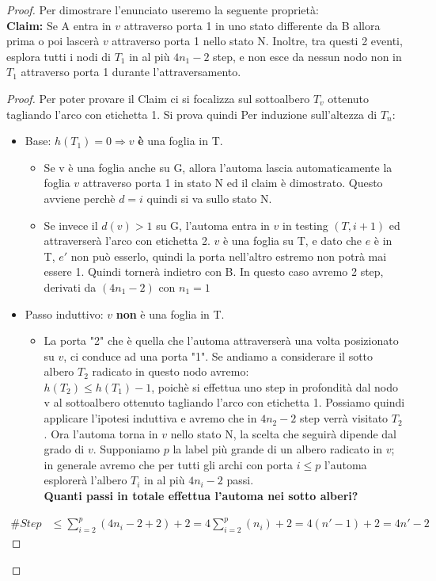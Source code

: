 \begin{proof}
Per dimostrare l'enunciato useremo la seguente proprietà:\\
\textbf{Claim: } Se A entra in $v$ attraverso porta 1 in uno stato differente da B allora prima o poi lascerà $v$ attraverso porta 1 nello stato N. Inoltre, tra questi 2 eventi, esplora tutti i nodi di $T_1$ in al più $4n_1 - 2$ step, e non esce da nessun nodo non in $T_1$ attraverso porta 1 durante l'attraversamento.
\begin{proof}
Per poter provare il Claim ci si focalizza sul sottoalbero $T_v$ ottenuto tagliando l'arco con etichetta 1. Si prova quindi Per induzione sull'altezza di $T_n$:
\begin{itemize}
    \item Base: $h(T_1) = 0 \Rightarrow v$ \textbf{è} una foglia in T.
        \begin{itemize}
            \item Se v è una foglia anche su G, allora l'automa lascia automaticamente la foglia $v$ attraverso porta 1 in stato N ed il claim è dimostrato. Questo avviene perchè $d=i$ quindi si va sullo stato N.
            \item Se invece il $d(v)>1$ su G, l'automa entra in $v$ in testing $(T, i+1)$ ed attraverserà l'arco con etichetta 2. $v$ è una foglia su T, e dato che $e$ è in T, $e'$ non può esserlo, quindi la porta nell'altro estremo non potrà mai essere 1. Quindi tornerà indietro con B. In questo caso avremo 2 step, derivati da $(4n_1 -2)$ con $n_1=1$ 
        \end{itemize}
    \item Passo induttivo: $v$ \textbf{non} è una foglia in T.
    \begin{itemize}
        \item La porta "2" che è quella che l'automa attraverserà una volta posizionato su $v$, ci conduce ad una porta "1". Se andiamo a considerare il sotto albero $T_2$ radicato in questo nodo avremo:\\
        $h(T_2) \leq h(T_1) -1$, poichè si effettua uno step in profondità dal nodo v al sottoalbero ottenuto tagliando l'arco con etichetta 1.
        Possiamo quindi applicare l'ipotesi induttiva e avremo che in $4n_2-2$ step verrà visitato $T_2$.
        Ora l'automa torna in $v$ nello stato N, la scelta che seguirà dipende dal grado di $v$. Supponiamo $p$ la label più grande di un albero radicato in $v$; in generale avremo che per tutti gli archi con porta $i \leq p$ l'automa esplorerà l'albero $T_i$ in al più $4n_i - 2$ passi.\\
        \textbf{Quanti passi in totale effettua l'automa nei sotto alberi?}
    \end{itemize}
\end{itemize}
\begin{equation}\nonumber
\begin{split}
\#Step & \leq \sum_{i=2}^{p} (4 n_i - 2 +2) +2= 4\sum_{i=2}^{p} (n_i)+2  = 4(n'-1)+2 = 4n'-2
\end{split}
\end{equation}


\end{proof}
\end{proof}
